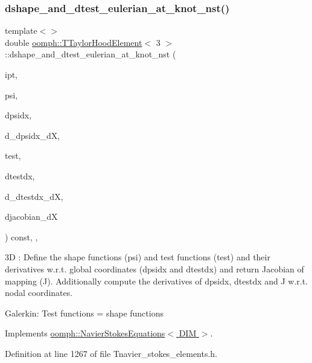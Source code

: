 \subsubsection{\texorpdfstring{dshape\+\_\+and\+\_\+dtest\+\_\+eulerian\+\_\+at\+\_\+knot\+\_\+nst()}{dshape\_and\_dtest\_eulerian\_at\_knot\_nst()}\hspace{0.1cm}{\footnotesize\ttfamily [4/4]}}
{\footnotesize\ttfamily template$<$$>$ \\
double \hyperlink{classoomph_1_1TTaylorHoodElement}{oomph\+::\+T\+Taylor\+Hood\+Element}$<$ 3 $>$\+::dshape\+\_\+and\+\_\+dtest\+\_\+eulerian\+\_\+at\+\_\+knot\+\_\+nst (\begin{DoxyParamCaption}\item[{const unsigned \&}]{ipt,  }\item[{\hyperlink{classoomph_1_1Shape}{Shape} \&}]{psi,  }\item[{\hyperlink{classoomph_1_1DShape}{D\+Shape} \&}]{dpsidx,  }\item[{\hyperlink{classoomph_1_1RankFourTensor}{Rank\+Four\+Tensor}$<$ double $>$ \&}]{d\+\_\+dpsidx\+\_\+dX,  }\item[{\hyperlink{classoomph_1_1Shape}{Shape} \&}]{test,  }\item[{\hyperlink{classoomph_1_1DShape}{D\+Shape} \&}]{dtestdx,  }\item[{\hyperlink{classoomph_1_1RankFourTensor}{Rank\+Four\+Tensor}$<$ double $>$ \&}]{d\+\_\+dtestdx\+\_\+dX,  }\item[{\hyperlink{classoomph_1_1DenseMatrix}{Dense\+Matrix}$<$ double $>$ \&}]{djacobian\+\_\+dX }\end{DoxyParamCaption}) const\hspace{0.3cm}{\ttfamily [inline]}, {\ttfamily [protected]}, {\ttfamily [virtual]}}

3D \+: Define the shape functions (psi) and test functions (test) and their derivatives w.\+r.\+t. global coordinates (dpsidx and dtestdx) and return Jacobian of mapping (J). Additionally compute the derivatives of dpsidx, dtestdx and J w.\+r.\+t. nodal coordinates.

Galerkin\+: Test functions = shape functions 

Implements \hyperlink{classoomph_1_1NavierStokesEquations_afbc63afd804f5143c74b0ca1be76ef82}{oomph\+::\+Navier\+Stokes\+Equations$<$ D\+I\+M $>$}.



Definition at line 1267 of file Tnavier\+\_\+stokes\+\_\+elements.\+h.



